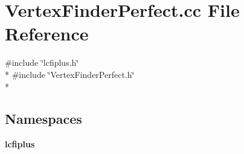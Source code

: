 \section{Vertex\-Finder\-Perfect.\-cc File Reference}
\label{VertexFinderPerfect_8cc}
{\ttfamily \#include \char`\"{}lcfiplus.\-h\char`\"{}}\\*
{\ttfamily \#include \char`\"{}Vertex\-Finder\-Perfect.\-h\char`\"{}}\\*
\subsection*{Namespaces}
\begin{DoxyCompactItemize}
\item 
{\bf lcfiplus}
\end{DoxyCompactItemize}
